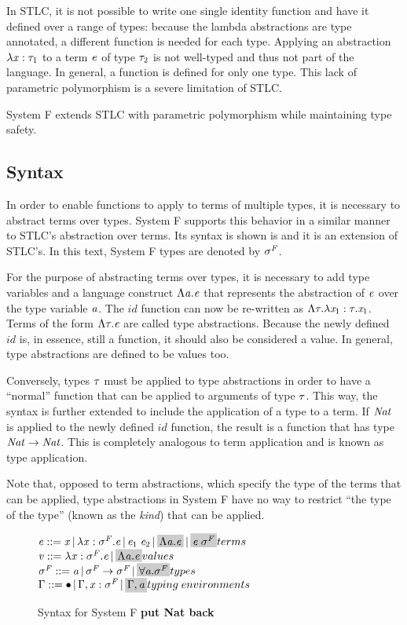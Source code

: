 In STLC, it is not possible to write one single identity function and have it defined over a range of types: because the lambda abstractions are type annotated, a different function is needed for each type. Applying an abstraction $\lambda \mathit{x} : \mathit{\tau}_1$ to a term $\mathit{e}$ of type $\mathit{\tau}_2$ is not well-typed and thus not part of the language. In general, a function is defined for only one type. This lack of parametric polymorphism is a severe limitation of STLC.

System F \cite{systemf,girard} extends STLC with parametric polymorphism while maintaining type safety.

\subsection{Syntax}
In order to enable functions to apply to terms of multiple types, it is necessary to abstract terms over types. System F supports this behavior in a similar manner to STLC's abstraction over terms. Its syntax is shown is  and it is an extension of STLC's. In this text, System F types are denoted by $\mathit{\sigma^F}$.

For the purpose of abstracting terms over types, it is necessary to add type variables and a language construct $\Lambda \mathit{a}.\mathit{e}$ that represents the abstraction of $\mathit{e}$ over the type variable $\mathit{a}$. The $id$ function can now be re-written as $\Lambda \mathit{\tau}. \lambda \mathit{x}_1: \mathit{\tau} . \mathit{x}_1$. Terms of the form $\Lambda \mathit{\tau}.\mathit{e}$ are called type abstractions. Because the newly defined $id$ is, in essence, still a function, it should also be considered a value. In general, type abstractions are defined to be values too.

Conversely, types $\mathit{\tau}$ must be applied to type abstractions in order to have a ``normal'' function that can be applied to arguments of type $\mathit{\tau}$. This way, the syntax is further extended to include the application of a type to a term. If $\mathit{Nat}$ is applied to the newly defined $id$ function, the result is a function that has type $\mathit{Nat} \rightarrow \mathit{Nat}$. This is completely analogous to term application and is known as type application.

Note that, opposed to term abstractions, which specify the type of the terms that can be applied, type abstractions in System F have no way to restrict ``the type of the type'' (known as the \textit{kind}) that can be applied.

\begin{figure}
    $\term ::= \tmVar\,|\,\lambda \tmVar:\typeF.\term\,|\,\term_1 \; \term_2 \,|\,\highlight{\Lambda \tyVar .\term}\,|\,\highlight{\term\;\typeF} \hfill terms $\\
  $\tmVal::= \lambda \tmVar:\typeF.\term \,|\, \highlight{\Lambda \tyVar. \term}\hfill values$\\
  $\typeF ::= \tyVar\,|\,\typeF \rightarrow \typeF \,|\,\highlight{\forall \tyVar.\typeF}\hfill types$\\
  $\tyEnv::=  \bullet \,|\, \tyEnv, \tmVar:\typeF\,|\,\highlight{ \tyEnv,\tyVar}\hfill typing\;environments$\\
  \caption{Syntax for System F \textbf{put Nat back}}
  \label{sysfsyntax}
\end{figure}

